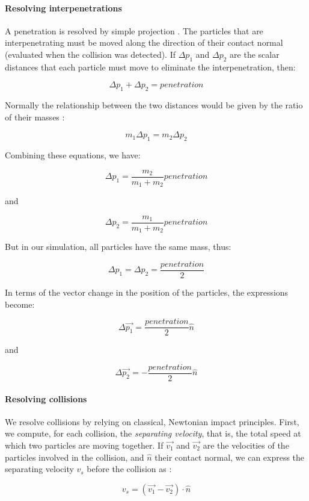 \documentclass[manuscript, screen]{timtm}
\begin{document}
\paragraph{Resolving interpenetrations}

A penetration is resolved by simple projection \cite{jakobsen2001advanced, game-physics-millington}. The particles that are interpenetrating must be moved along the direction of their contact normal (evaluated when the collision was detected). If $\Delta p_1$ and $\Delta p_2$ are the scalar distances that each particle must move to eliminate the interpenetration, then:

\[
\Delta p_1 + \Delta p_2 = penetration
\]

Normally the relationship between the two distances would be given by the ratio of their masses \cite{game-physics-millington}:

\[
m_1\Delta p_1 = m_2\Delta p_2
\]

Combining these equations, we have:

\[
\Delta p_1 = \frac{m_2}{m_1 + m_2} penetration
\]

and

\[
\Delta p_2 = \frac{m_1}{m_1 + m_2} penetration
\]

But in our simulation, all particles have the same mass, thus:

\[
\Delta p_1 = \Delta p_2 = \frac{penetration}{2}
\]

In terms of the vector change in the position of the particles, the expressions become:

\[
\Delta \vec{p_1} = \frac{penetration}{2} \hat{n}
\]

and

\[
\Delta \vec{p_2} = -\frac{penetration}{2} \hat{n}
\]

\paragraph{Resolving collisions}

We resolve collisions by relying on classical, Newtonian impact principles. First, we compute, for each collision, the \textit{separating velocity}, that is, the total speed at which two particles are moving together. If $\vec{v_1}$ and $\vec{v_2}$ are the velocities of the particles involved in the collision, and $\hat{n}$ their contact normal, we can express the separating velocity $v_s$ before the collision as \cite{game-physics-millington}:

\[
v_s = ( \vec{v_1} - \vec{v_2} ) \cdot \hat{n}
\]
\end{document}
